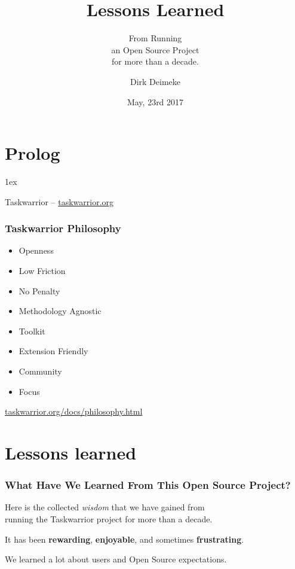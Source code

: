 \documentclass[t,handout,aspectratio=169]{beamer}
\title{Lessons Learned}
\subtitle{From Running \\ an Open Source Project \\ for more than a decade.}
\date{May, 23rd 2017}
\author{Dirk Deimeke}
\institute{Taskwarrior Academy @ LinuxERFA}
\begin{document}
\begin{frame}
    \titlepage
\end{frame}

\section{Prolog}

\parskip1ex

\begin{frame}[standout]
    Taskwarrior -- \href{https://taskwarrior.org/}{taskwarrior.org}
\end{frame}

\begin{frame}[fragile]\frametitle{Taskwarrior Philosophy}
    \vfill
    \begin{itemize}
        \item Openness
        \item Low Friction
        \item No Penalty
        \item Methodology Agnostic
        \item Toolkit
        \item Extension Friendly
        \item Community
        \item Focus
    \end{itemize}

    \href{https://taskwarrior.org/docs/philosophy.html}{taskwarrior.org/docs/philosophy.html}
\end{frame}

\section{Lessons learned}

\begin{frame}[fragile]\frametitle{What Have We Learned From This Open Source Project?}
    \vfill
    Here is the collected \textit{wisdom} that we have gained from \\
    running the Taskwarrior project for more than a decade. \pause

    It has been \textbf{rewarding}, \textbf{enjoyable}, and sometimes \textbf{frustrating}. \pause

    We learned a lot about users and Open Source expectations.
\end{frame}
\end{document}
